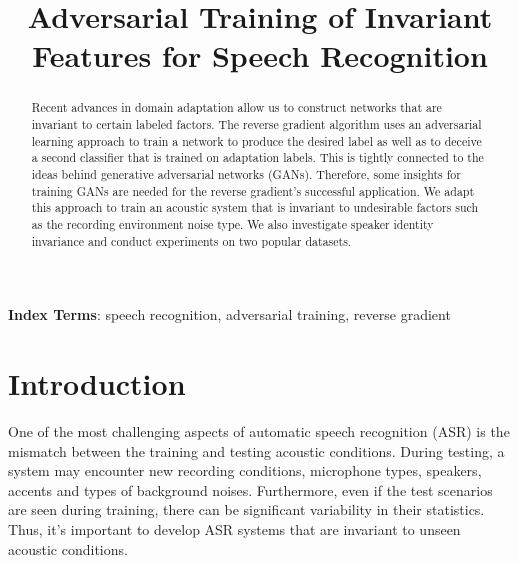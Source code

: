 \documentclass[a4paper]{article}
\title{Adversarial Training of Invariant Features for Speech Recognition}
\begin{document}
\maketitle
% 
\begin{abstract}
Recent advances in domain adaptation allow us to construct networks that are
invariant to certain labeled factors. The reverse gradient algorithm uses an
adversarial learning approach to train a network to produce the desired label
as well as to deceive a second classifier that is trained on adaptation 
labels. This is tightly connected to the ideas behind generative adversarial 
networks (GANs). Therefore, some insights for training GANs are needed for the
reverse gradient's successful application. We adapt this approach to train an 
acoustic system that is invariant to undesirable factors such as the recording
environment noise type. We also investigate speaker identity invariance and 
conduct experiments on two popular datasets.
\end{abstract}
\noindent\textbf{Index Terms}: speech recognition, adversarial training, 
reverse gradient
\section{Introduction}
\label{sec:intro}
    One of the most challenging aspects of automatic speech recognition (ASR)
    is the mismatch between the training and testing acoustic conditions. 
    During testing, a system may encounter new recording conditions, 
    microphone types, speakers, accents and types of background noises. 
    Furthermore, even if the test scenarios are seen during training, there 
    can be significant variability in their statistics. Thus, it's important to 
    develop ASR systems that are invariant to unseen acoustic conditions.
\end{document}
